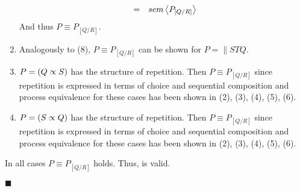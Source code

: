 \begin{myproof}
\begin{enumerate}
\begin{eqnarray*}
              & = & sem \left\langle P_{\left[ Q / R \right]} \right\rangle
    \end{eqnarray*}
    And thus $P \equiv P_{\left[ Q / R \right]}$.
  \item Analogously to (8), $P \equiv P_{\left[ Q / R \right]}$ can be shown for $P = \parallel{S}{T}{Q}$.
  \item $P = \left( Q \propto S \right)$ has the structure of repetition. Then $P \equiv P_{\left[ Q / R \right]}$ since repetition is expressed in terms of choice and sequential composition and process equivalence for these cases has been shown in (2), (3), (4), (5), (6).
  \item $P = \left( S \propto Q \right)$ has the structure of repetition. Then $P \equiv P_{\left[ Q / R \right]}$ since repetition is expressed in terms of choice and sequential composition and process equivalence for these cases has been shown in (2), (3), (4), (5), (6).
\end{enumerate}
In all cases $P \equiv P_{\left[ Q / R \right]}$ holds. Thus,  is valid.

\hfill$\blacksquare$
\end{myproof}